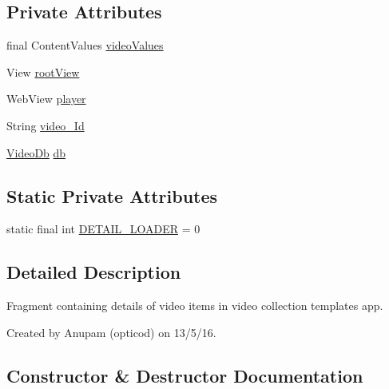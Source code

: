 \subsection*{Private Attributes}
\begin{DoxyCompactItemize}
\item 
final Content\+Values \hyperlink{classorg_1_1buildmlearn_1_1videocollection_1_1fragment_1_1DetailActivityFragment_a1121174d70919db7f4037a6ac38eb9c6}{video\+Values}
\item 
View \hyperlink{classorg_1_1buildmlearn_1_1videocollection_1_1fragment_1_1DetailActivityFragment_a07a96869d4cbc5f57e419da736149996}{root\+View}
\item 
Web\+View \hyperlink{classorg_1_1buildmlearn_1_1videocollection_1_1fragment_1_1DetailActivityFragment_a972377398544a42f2b9d4cd2a6d13dda}{player}
\item 
String \hyperlink{classorg_1_1buildmlearn_1_1videocollection_1_1fragment_1_1DetailActivityFragment_a8eaabd0ef2d03ffff180098ea4f9dc3a}{video\+\_\+\+Id}
\item 
\hyperlink{classorg_1_1buildmlearn_1_1videocollection_1_1data_1_1VideoDb}{Video\+Db} \hyperlink{classorg_1_1buildmlearn_1_1videocollection_1_1fragment_1_1DetailActivityFragment_a58b01e0346dedef5e58cd3b118e5536e}{db}
\end{DoxyCompactItemize}
\subsection*{Static Private Attributes}
\begin{DoxyCompactItemize}
\item 
static final int \hyperlink{classorg_1_1buildmlearn_1_1videocollection_1_1fragment_1_1DetailActivityFragment_a7474e09d9e9b0fe5989fba1d5631de85}{D\+E\+T\+A\+I\+L\+\_\+\+L\+O\+A\+D\+ER} = 0
\end{DoxyCompactItemize}


\subsection{Detailed Description}
Fragment containing details of video items in video collection template\textquotesingle{}s app. 

Created by Anupam (opticod) on 13/5/16. 

\subsection{Constructor \& Destructor Documentation}
